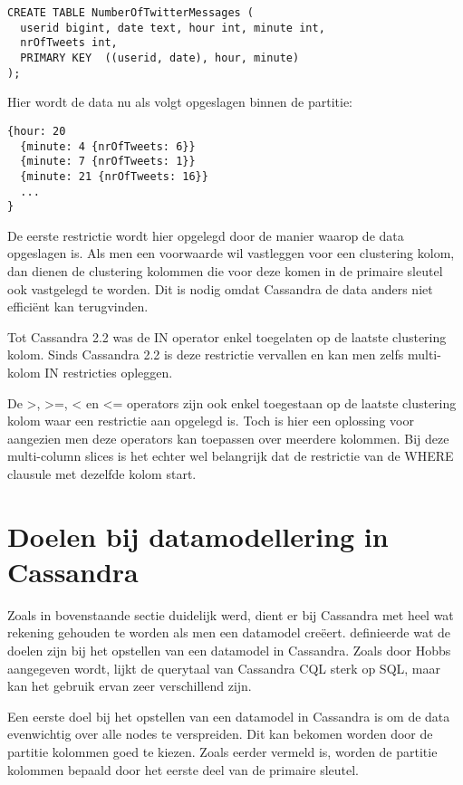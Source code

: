\begin{lstlisting}
CREATE TABLE NumberOfTwitterMessages (
  userid bigint, date text, hour int, minute int,
  nrOfTweets int,
  PRIMARY KEY  ((userid, date), hour, minute)
);
\end{lstlisting}

Hier wordt de data nu als volgt opgeslagen binnen de partitie: 

\begin{lstlisting}
{hour: 20 
  {minute: 4 {nrOfTweets: 6}} 
  {minute: 7 {nrOfTweets: 1}}
  {minute: 21 {nrOfTweets: 16}}
  ...
}
\end{lstlisting}

De eerste restrictie wordt hier opgelegd door de manier waarop de data opgeslagen is.
Als men een voorwaarde wil vastleggen voor een clustering kolom, dan dienen de clustering kolommen die voor deze komen in de primaire sleutel ook vastgelegd te worden.
Dit is nodig omdat Cassandra de data anders niet efficiënt kan terugvinden.

Tot Cassandra 2.2 was de IN operator enkel toegelaten op de laatste clustering kolom.
Sinds Cassandra 2.2 is deze restrictie vervallen en kan men zelfs multi-kolom IN restricties opleggen.

De >, >=, < en <= operators zijn ook enkel toegestaan op de laatste clustering kolom waar een restrictie aan opgelegd is.
Toch is hier een oplossing voor aangezien men deze operators kan toepassen over meerdere kolommen.
Bij deze multi-column slices is het echter wel belangrijk dat de restrictie van de WHERE clausule met dezelfde kolom start.

\section{Doelen bij datamodellering in Cassandra}
Zoals in bovenstaande sectie duidelijk werd, dient er bij Cassandra met heel wat rekening gehouden te worden als men een datamodel creëert.
\cite{Hobbs2015Datamodelling} definieerde wat de doelen zijn bij het opstellen van een datamodel in Cassandra.
Zoals door Hobbs aangegeven wordt, lijkt de querytaal van Cassandra CQL sterk op SQL, maar kan het gebruik ervan zeer verschillend zijn.

Een eerste doel bij het opstellen van een datamodel in Cassandra is om de data evenwichtig over alle nodes te verspreiden.
Dit kan bekomen worden door de partitie kolommen goed te kiezen.
Zoals eerder vermeld is, worden de partitie kolommen bepaald door het eerste deel van de primaire sleutel.

